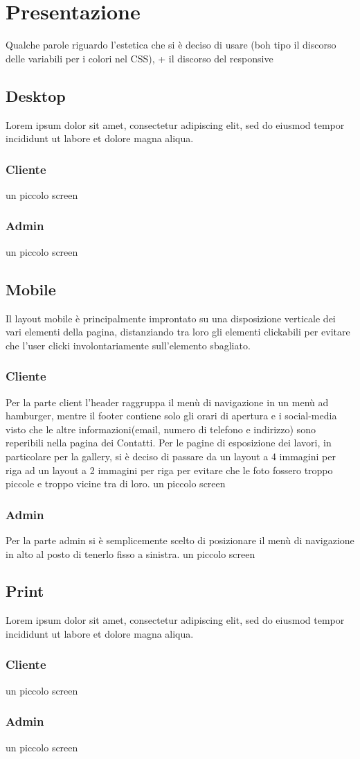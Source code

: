 \section{Presentazione}
Qualche parole riguardo l'estetica che si è deciso di usare (boh tipo il discorso delle variabili per i colori nel CSS), + il discorso del responsive
\subsection{Desktop}
Lorem ipsum dolor sit amet, consectetur adipiscing elit, sed do eiusmod tempor incididunt ut labore et dolore magna aliqua. 
\subsubsection{Cliente}
un piccolo screen
\subsubsection{Admin}
un piccolo screen

\subsection{Mobile}
Il layout mobile è principalmente improntato su una disposizione verticale dei vari elementi della pagina, distanziando tra loro gli elementi clickabili per evitare che l'user clicki involontariamente sull'elemento sbagliato. 
\subsubsection{Cliente}
Per la parte client l'header raggruppa il menù di navigazione in un menù ad hamburger, mentre il footer contiene solo gli orari di apertura e i social-media visto che le altre informazioni(email, numero di telefono e indirizzo) sono reperibili nella pagina dei Contatti. Per le pagine di esposizione dei lavori, in particolare per la gallery, si è deciso di passare da un layout a 4 immagini per riga ad un layout a 2 immagini per riga per evitare che le foto fossero troppo piccole e troppo vicine tra di loro.
un piccolo screen
\subsubsection{Admin}
Per la parte admin si è semplicemente scelto di posizionare il menù di navigazione in alto al posto di tenerlo fisso a sinistra.
un piccolo screen

\subsection{Print}
Lorem ipsum dolor sit amet, consectetur adipiscing elit, sed do eiusmod tempor incididunt ut labore et dolore magna aliqua. 
\subsubsection{Cliente}
un piccolo screen
\subsubsection{Admin}
un piccolo screen
